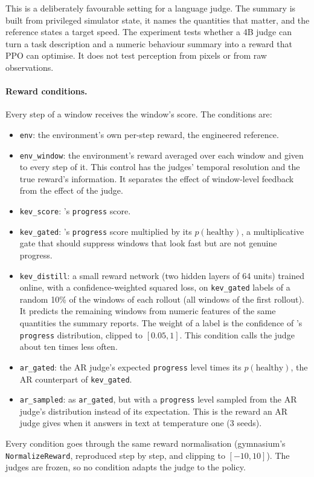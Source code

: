 This is a deliberately favourable setting for a language judge. The summary is built from privileged simulator state,
it names the quantities that matter, and the reference states a target speed. The experiment tests whether a 4B judge
can turn a task description and a numeric behaviour summary into a reward that PPO can optimise. It does not test
perception from pixels or from raw observations.

\paragraph{Reward conditions.} Every step of a window receives the window's score. The conditions are:
\begin{itemize}
\item \texttt{env}: the environment's own per-step reward, the engineered reference.
\item \texttt{env\_window}: the environment's reward averaged over each window and given to every step of it. This
  control has the judges' temporal resolution and the true reward's information. It separates the effect of
  window-level feedback from the effect of the judge.
\item \texttt{kev\_score}: \kev{}'s \texttt{progress} score.
\item \texttt{kev\_gated}: \kev{}'s \texttt{progress} score multiplied by its $p(\text{healthy})$, a multiplicative gate
  that should suppress windows that look fast but are not genuine progress.
\item \texttt{kev\_distill}: a small reward network (two hidden layers of 64 units) trained online, with a
  confidence-weighted squared loss, on \texttt{kev\_gated} labels of a random 10\% of the windows of each rollout (all
  windows of the first rollout). It predicts the remaining windows from numeric features of the same quantities the
  summary reports. The weight of a label is the confidence of \kev{}'s \texttt{progress} distribution, clipped to
  $[0.05,1]$. This condition calls the judge about ten times less often.
\item \texttt{ar\_gated}: the AR judge's expected \texttt{progress} level times its $p(\text{healthy})$, the AR
  counterpart of \texttt{kev\_gated}.
\item \texttt{ar\_sampled}: as \texttt{ar\_gated}, but with a \texttt{progress} level sampled from the AR judge's
  distribution instead of its expectation. This is the reward an AR judge gives when it answers in text at temperature
  one (3 seeds).
\end{itemize}
Every condition goes through the same reward normalisation (gymnasium's \texttt{NormalizeReward}, reproduced step by
step, and clipping to $[-10,10]$). The judges are frozen, so no condition adapts the judge to the policy.


